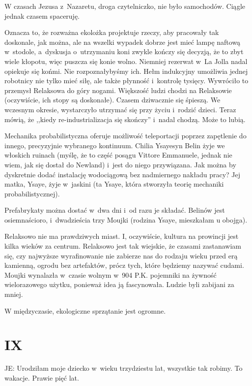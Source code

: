 \documentclass[oneside,polish,12pt,sfheadings]{mwbk}
\begin{document}
W czasach Jezusa z~Nazaretu, droga czytelniczko, nie było samochodów.
Ciągle jednak czasem spaceruję.

Oznacza to, że rozważna ekolożka projektuje rzeczy, aby pracowały
tak doskonale, jak można, ale na wszelki wypadek dobrze jest mieć
lampę naftową w~stodole, a~dyskusja o~utrzymaniu koni zwykle kończy
się decyzją, że to zbyt wiele kłopotu, więc puszcza się konie wolno.
Niemniej rezerwat w~La Jolla nadal opiekuje się końmi. Nie rozpoznałybyśmy
ich. Hełm indukcyjny umożliwia jednej robotnicy nie tylko mieć siłę,
ale także płynność i~kontrolę tysięcy. Wywróciło to przemysł Relaksowa
do góry nogami. Większość ludzi chodzi na Relaksowie (oczywiście,
ich stopy są doskonałe). Czasem dziwacznie się śpieszą. We wczesnym
okresie, wystarczyło utrzymać się przy życiu i~rodzić dzieci. Teraz
mówią, że ,,kiedy re-industrializacja się skończy'' i~nadal chodzą.
Może to lubią.

Mechanika probabilistyczna oferuje możliwość teleportacji poprzez
zapętlenie do innego, precyzyjnie wybranego kontinuum. Chilia Ysayesyn
Belin żyje we włoskich ruinach (myślę, że to część posągu Vittore
Emmanuele, jednak nie wiem, jak się dostał do Newland) i~jest do niego
przywiązana. Jak można by dyskretnie dodać instalację wodociągową bez
nadmiernego nakładu pracy? Jej matka, Ysaye, żyje w~jaskini (ta Ysaye,
która stworzyła teorię mechaniki probabilistycznej).

Prefabrykaty można dostać w~dwa dni i~od razu je składać. Belinów
jest osiemnaścioro, i~dwadzieścia trzy Moujki (rodzina Ysaye, mieszkałam
u obojga).

Relaksowo nie ma prawdziwych miast. I, oczywiście, kultura na prowincji
jest kilka wieków za centrum. Relaksowo jest tak wiejskie, że czasami
zastanawiam się, czy najwyższe wyrafinowanie nie zabierze nas do rodzaju
wieku przed erą kamienną, ogrodu bez artefaktów, prócz tych, które
będziemy nazywać cudami. Moujki wynalazła w~czasie wolnym w~904 P.K.
pojemniki na żywność wielorazowego użytku, ponieważ idea ją fascynowała.
Ludzie byli zabijani za mniej.

W międzyczasie, ekologiczne sprzątanie jest ogromne.

\chapter{IX}

JE: Urodziłam moje dziecko w~wieku trzydziestu lat, wszystkie tak
robimy. To wakacje. Prawie pięć lat.
\end{document}
